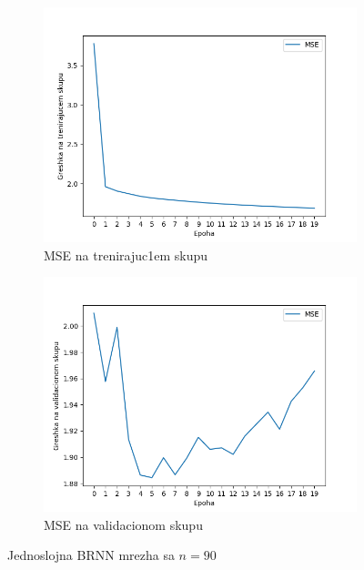 \documentclass[a4paper, openany, oneside, 11pt]{book}
\begin{document}
\begin{figure}[!h]
        \centering
        \begin{subfigure}{0.475\textwidth}
            \centering
            \includegraphics[scale=0.45]{res/SL_BLSTM_90units_d00_train.png}
            \caption{\acrshort{MSE} na trenirajuc1em skupu}
            \label{fig:4_8a}
            \vspace{0pt}
        \end{subfigure}%
        \begin{subfigure}{0.475\textwidth}
            \centering
            \includegraphics[scale=0.45]{res/SL_BLSTM_90units_d00_validation.png}
            \caption{\acrshort{MSE} na validacionom skupu}
            \label{fig:4_8b}
            \vspace{0pt}
        \end{subfigure}
        \caption{Jednoslojna \acrshort{BRNN} mrezha sa $n=90$}
        \label{fig:4_8}
\end{figure}
\end{document}
